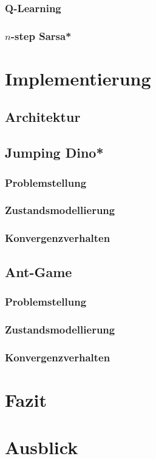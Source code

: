 \documentclass[12pt]{article}
\numberwithin{equation}{section}
\begin{document}
		\subsubsection{Q-Learning}
		
		\pagebreak
		\subsubsection{$n$-step Sarsa*}

\section{Implementierung}
	\subsection{Architektur}
	\subsection{Jumping Dino*}
		\subsubsection{Problemstellung}
		\subsubsection{Zustandsmodellierung}
		\subsubsection{Konvergenzverhalten}
	\subsection{Ant-Game}
		\subsubsection{Problemstellung}
		\subsubsection{Zustandsmodellierung}
		\subsubsection{Konvergenzverhalten}

\section{Fazit}
\section{Ausblick}

\pagebreak


\pagebreak


\end{document}
